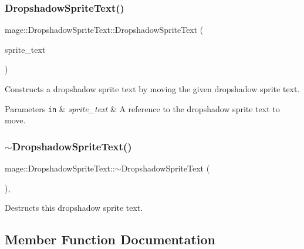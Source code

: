 \subsubsection{\texorpdfstring{Dropshadow\+Sprite\+Text()}{DropshadowSpriteText()}\hspace{0.1cm}{\footnotesize\ttfamily [4/4]}}
{\footnotesize\ttfamily mage\+::\+Dropshadow\+Sprite\+Text\+::\+Dropshadow\+Sprite\+Text (\begin{DoxyParamCaption}\item[{\hyperlink{classmage_1_1_dropshadow_sprite_text}{Dropshadow\+Sprite\+Text} \&\&}]{sprite\+\_\+text }\end{DoxyParamCaption})\hspace{0.3cm}{\ttfamily [default]}}

Constructs a dropshadow sprite text by moving the given dropshadow sprite text.


\begin{DoxyParams}[1]{Parameters}
\mbox{\tt in}  & {\em sprite\+\_\+text} & A reference to the dropshadow sprite text to move. \\
\hline
\end{DoxyParams}
\hypertarget{classmage_1_1_dropshadow_sprite_text_a561b1be59d05bccb680969be792c0e28}{}\label{classmage_1_1_dropshadow_sprite_text_a561b1be59d05bccb680969be792c0e28} 
\subsubsection{\texorpdfstring{$\sim$\+Dropshadow\+Sprite\+Text()}{~DropshadowSpriteText()}}
{\footnotesize\ttfamily mage\+::\+Dropshadow\+Sprite\+Text\+::$\sim$\+Dropshadow\+Sprite\+Text (\begin{DoxyParamCaption}{ }\end{DoxyParamCaption})\hspace{0.3cm}{\ttfamily [virtual]}, {\ttfamily [default]}}

Destructs this dropshadow sprite text. 

\subsection{Member Function Documentation}
\hypertarget{classmage_1_1_dropshadow_sprite_text_a0dcce82b4a83fbd469d68adba21af220}{}\label{classmage_1_1_dropshadow_sprite_text_a0dcce82b4a83fbd469d68adba21af220} 
